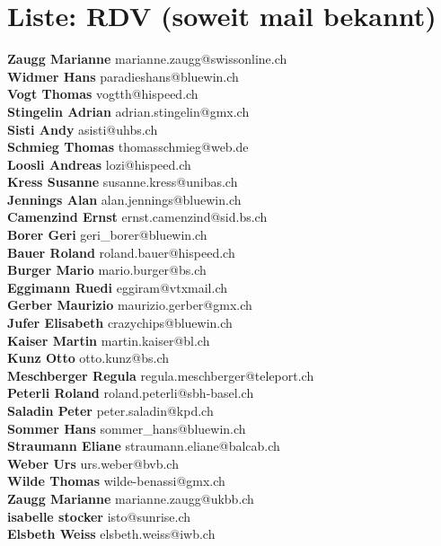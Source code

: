 \documentclass{scrartcl}
\begin{document}
\section*{Liste: RDV (soweit mail bekannt)}
\textbf{Zaugg Marianne } marianne.zaugg@swissonline.ch\\
\textbf{Widmer Hans } paradieshans@bluewin.ch\\
\textbf{Vogt Thomas } vogtth@hispeed.ch\\
\textbf{Stingelin Adrian } adrian.stingelin@gmx.ch\\
\textbf{Sisti Andy } asisti@uhbs.ch\\
\textbf{Schmieg Thomas } thomasschmieg@web.de\\
\textbf{Loosli Andreas } lozi@hispeed.ch\\
\textbf{Kress Susanne } susanne.kress@unibas.ch\\
\textbf{Jennings Alan } alan.jennings@bluewin.ch\\
\textbf{Camenzind Ernst } ernst.camenzind@sid.bs.ch\\
\textbf{Borer Geri } geri_borer@bluewin.ch\\
\textbf{Bauer Roland } roland.bauer@hispeed.ch\\
\textbf{Burger Mario } mario.burger@bs.ch\\
\textbf{Eggimann Ruedi } eggiram@vtxmail.ch\\
\textbf{Gerber Maurizio } maurizio.gerber@gmx.ch\\
\textbf{Jufer Elisabeth } crazychips@bluewin.ch\\
\textbf{Kaiser Martin } martin.kaiser@bl.ch\\
\textbf{Kunz Otto } otto.kunz@bs.ch\\
\textbf{Meschberger Regula } regula.meschberger@teleport.ch\\
\textbf{Peterli Roland } roland.peterli@sbh-basel.ch\\
\textbf{Saladin Peter } peter.saladin@kpd.ch\\
\textbf{Sommer Hans } sommer_hans@bluewin.ch\\
\textbf{Straumann Eliane } straumann.eliane@balcab.ch\\
\textbf{Weber Urs } urs.weber@bvb.ch\\
\textbf{Wilde Thomas } wilde-benassi@gmx.ch\\
\textbf{Zaugg Marianne } marianne.zaugg@ukbb.ch\\
\textbf{isabelle stocker } isto@sunrise.ch\\
\textbf{Elsbeth Weiss } elsbeth.weiss@iwb.ch\\
\end{document}
